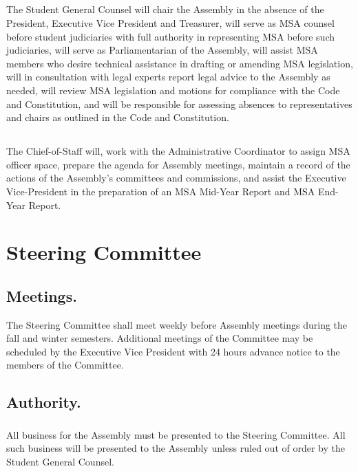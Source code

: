 \subsection{}
The Student General Counsel will chair the Assembly in the absence of the President, Executive Vice President and Treasurer, will serve as MSA counsel before student judiciaries with  full authority in representing MSA before such judiciaries, will serve as Parliamentarian of the Assembly, will assist MSA members who desire technical assistance in drafting or amending MSA legislation, will in consultation with legal experts report legal advice to the Assembly as needed, will review MSA legislation and motions for compliance with the Code and Constitution, and will be responsible for assessing absences to representatives and chairs as outlined in the Code and Constitution.

\subsection{}
The Chief-of-Staff will, work with the Administrative Coordinator to assign MSA officer space, prepare the agenda for Assembly meetings, maintain a record of the actions of the Assembly's committees and commissions, and assist the Executive Vice-President in the preparation of an MSA Mid-Year Report and MSA End-Year Report.


\section{Steering Committee}

\subsection{Meetings.}  The Steering Committee shall meet weekly before Assembly meetings during the fall and winter semesters.  Additional meetings of the Committee may be scheduled by the Executive Vice President with 24 hours advance notice to the members of the Committee.

\subsection{Authority.}
\subsubsection{}
All business for the Assembly must be presented to the Steering Committee.  All such business will be presented to the Assembly unless ruled out of order by the Student General Counsel.
